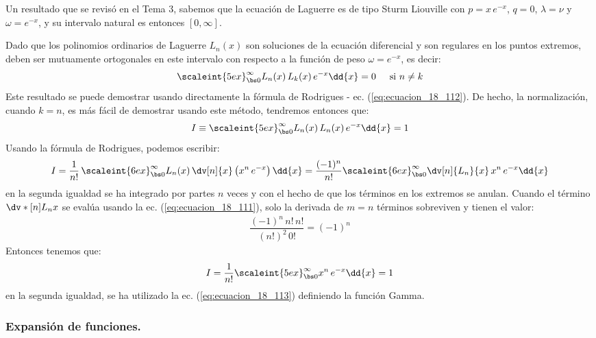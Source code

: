 Un resultado que se revisó en el Tema 3, sabemos que la ecuación de Laguerre es de tipo Sturm Liouville con $p = x \, e^{-x}$, $q = 0$, $\lambda = \nu$ y $\omega = e^{-x}$, y su intervalo natural es entonces $[0, \infty]$.
\par
Dado que los polinomios ordinarios de Laguerre $L_{n} (x)$ son soluciones de la ecuación diferencial y son regulares en los puntos extremos, deben ser mutuamente ortogonales en este intervalo con respecto a la función de peso $\omega = e^{-x}$, es decir:
\begin{align*}
\scaleint{5ex}_{\bs 0}^{\infty} L_{n}(x) \, L_{k} (x) \, e^{-x} \dd{x} = 0 \hspace{0.5cm} \text{si } n \neq k
\end{align*}
Este resultado se puede demostrar usando directamente la fórmula de Rodrigues - ec. (\ref{eq:ecuacion_18_112}). De hecho, la normalización, cuando $k = n$, es más fácil de demostrar usando este método, tendremos entonces que:
\begin{align}
I \equiv \scaleint{5ex}_{\bs 0}^{\infty} L_{n} (x) \, L_{n} (x) \, e^{-x} \dd{x} = 1
\label{eq:ecuacion_18_113}
\end{align}
Usando la fórmula de Rodrigues, podemos escribir:
\begin{align*}
I = \dfrac{1}{n!} \, \scaleint{6ex}_{\bs 0}^{\infty} L_{n}(x) \, \dv[n]{x} \left( x^{n} \, e^{-x} \right) \dd{x} = \dfrac{(-1)^{n}}{n!} \scaleint{6ex}_{\bs 0}^{\infty} \dv[n]{L_{n}}{x} \, x^{n} \, e^{-x} \dd{x}
\end{align*}
en la segunda igualdad se ha integrado por partes $n$ veces y con el hecho de que los términos en los extremos se anulan. Cuando el término $\dv*[n]{L_{n}}{x}$ se evalúa usando la ec. (\ref{eq:ecuacion_18_111}), solo la derivada de $m = n$ términos sobreviven y tienen el valor:
\begin{align*}
\dfrac{(-1)^{n} \, n! \, n!}{(n!)^{2} \, 0!} = (-1)^{n}
\end{align*}
Entonces tenemos que:
\begin{align*}
I = \dfrac{1}{n!} \scaleint{5ex}_{\bs 0}^{\infty} x^{n} \, e^{-x} \dd{x} = 1
\end{align*}
en la segunda igualdad, se ha utilizado la ec. (\ref{eq:ecuacion_18_113}) definiendo la función \break \hfill Gamma.

\subsubsection{Expansión de funciones.}

